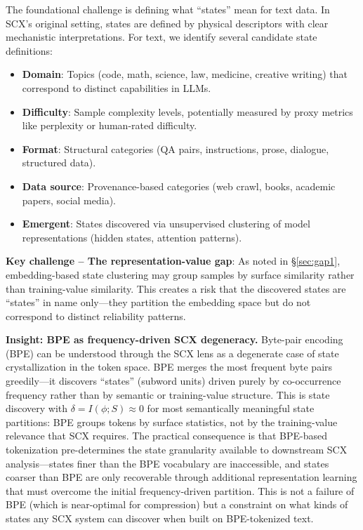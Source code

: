 \documentclass[11pt,twocolumn]{article}
\begin{document}
The foundational challenge is defining what ``states'' mean for text data. In SCX's original setting, states are defined by physical descriptors with clear mechanistic interpretations. For text, we identify several candidate state definitions:

\begin{itemize}
    \item \textbf{Domain}: Topics (code, math, science, law, medicine, creative writing) that correspond to distinct capabilities in LLMs.
    \item \textbf{Difficulty}: Sample complexity levels, potentially measured by proxy metrics like perplexity or human-rated difficulty.
    \item \textbf{Format}: Structural categories (QA pairs, instructions, prose, dialogue, structured data).
    \item \textbf{Data source}: Provenance-based categories (web crawl, books, academic papers, social media).
    \item \textbf{Emergent}: States discovered via unsupervised clustering of model representations (hidden states, attention patterns).
\end{itemize}

\textbf{Key challenge -- The representation-value gap}: As noted in \S\ref{sec:gap1}, embedding-based state clustering may group samples by surface similarity rather than training-value similarity. This creates a risk that the discovered states are ``states'' in name only---they partition the embedding space but do not correspond to distinct reliability patterns.

\textbf{Insight: BPE as frequency-driven SCX degeneracy.} Byte-pair encoding (BPE) can be understood through the SCX lens as a degenerate case of state crystallization in the token space. BPE merges the most frequent byte pairs greedily---it discovers ``states'' (subword units) driven purely by co-occurrence frequency rather than by semantic or training-value structure. This is state discovery with $\delta = I(\phi; S) \approx 0$ for most semantically meaningful state partitions: BPE groups tokens by surface statistics, not by the training-value relevance that SCX requires. The practical consequence is that BPE-based tokenization pre-determines the state granularity available to downstream SCX analysis---states finer than the BPE vocabulary are inaccessible, and states coarser than BPE are only recoverable through additional representation learning that must overcome the initial frequency-driven partition. This is not a failure of BPE (which is near-optimal for compression) but a constraint on what kinds of states any SCX system can discover when built on BPE-tokenized text.
\end{document}
